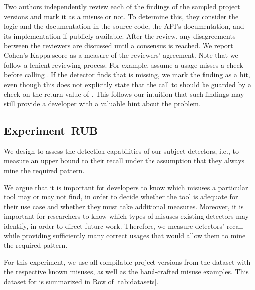 Two authors independently review each of the  findings of the sampled project versions and mark it as a misuse or not.
To determine this, they consider the logic and the documentation in the source code, the API's documentation, and its implementation if publicly available.
%
After the review, any disagreements between the reviewers are discussed until a consensus is reached.
We report Cohen's Kappa score as a measure of the reviewers' agreement.
%
Note that we follow a lenient reviewing process.
For example, assume a usage misses a check  before calling .
If the detector finds that  is missing, we mark the finding as a hit, even though this does not explicitly state that the call to  should be guarded by a check on the return value of .
This follows our intuition that such findings may still provide a developer with a valuable hint about the problem.


\subsection{Experiment~RUB}
\label{e1}

We design  to assess the detection capabilities of our subject detectors, i.e., to measure an upper bound to their recall under the assumption that they always mine the required pattern.

We argue that it is important for developers to know which misuses a particular tool may or may not find, in order to decide whether the tool is adequate for their use case and whether they must take additional measures.
Moreover, it is important for researchers to know which types of misuses existing detectors may identify, in order to direct future work.
Therefore, we measure detectors' recall while providing sufficiently many correct usages that would allow them to mine the required pattern.

For this experiment, we use all compilable project versions from the \MUBench dataset with the respective known misuses, as well as the hand-crafted misuse examples.
This dataset for  is summarized in Row  of \autoref{tab:datasets}.

